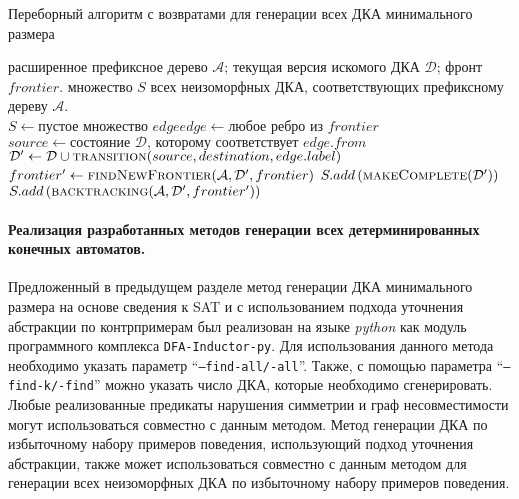 \begin{algorithm}[ht]
  \caption{Переборный алгоритм с возвратами для генерации всех ДКА минимального размера}
  \label{algo:backtracking}
  \begin{algorithmic}[0]
    \Require расширенное префиксное дерево $\mathcal{A}$; %
    текущая версия искомого ДКА $\mathcal{D}$; %
    фронт $frontier$.
    \Ensure множество $S$ всех неизоморфных ДКА, соответствующих префиксному дереву $\mathcal{A}$.
    \\\hrulefill
      \State $S \gets \text{пустое множество}$
      \State $edge edge \gets \text{любое ребро из } frontier$
        \State $source \gets \text{состояние }\mathcal{D}\text{, которому соответствует } edge.from$
        \State $\mathcal{D'} \gets \mathcal{D} \cup \Call{transition}{source, destination, edge.label}$
        \State $frontier' \gets \Call{findNewFrontier}{\mathcal{A}, \mathcal{D'}, frontier}$
            \State $S.add\left(\Call{makeComplete}{\mathcal{D'}}\right)$
          \Else
            \State $S.add\left(\Call{backtracking}{\mathcal{A}, \mathcal{D'}, frontier'}\right)$
          \EndIf
        \EndIf
      \EndFor
    \EndFunction
  \end{algorithmic}
\end{algorithm}


\paragraph*{Реализация разработанных методов генерации всех детерминированных конечных автоматов.}
\label{sec:findall:results:impl}

Предложенный в предыдущем разделе метод генерации ДКА минимального размера на основе сведения к SAT и с использованием подхода уточнения абстракции по контрпримерам был реализован на языке \emph{python} как модуль программного комплекса \texttt{DFA-Inductor-py}.
Для использования данного метода необходимо указать параметр ``\texttt{--find-all/-all}''.
Также, с помощью параметра ``\texttt{--find-k/-find}'' можно указать число ДКА, которые необходимо сгенерировать.
Любые реализованные предикаты нарушения симметрии и граф несовместимости могут использоваться совместно с данным методом.
Метод генерации ДКА по избыточному набору примеров поведения, использующий подход уточнения абстракции, также может использоваться совместно с данным методом для генерации всех неизоморфных ДКА по избыточному набору примеров поведения.

